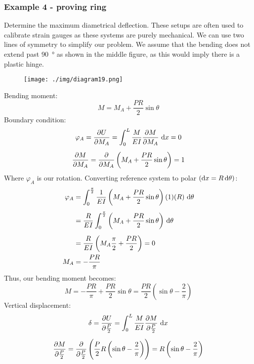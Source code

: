 \subsubsection{Example 4 - proving ring}
Determine the maximum diametrical deflection. These setups are often used to calibrate strain gauges as these systems are purely mechanical. We can use two lines of symmetry to simplify our problem. We assume that the bending does not extend past \SI{90}{\degree} as shown in the middle figure, as this would imply there is a plastic hinge.
\begin{figure}[H]
  \centering
  \texttt{[image: ./img/diagram19.png]}
  \caption{}
\end{figure}
Bending moment:
\begin{equation}
  M = M_A + \frac{PR}{2} \sin\theta
\end{equation}
Boundary condition:
\begin{gather}
  \varphi_A = \frac{\partial U}{\partial M_A } = \int_0^L \frac{M}{EI} \frac{\partial M}{\partial M_A}\, \dif x = 0\\[5pt]
  \frac{\partial M}{\partial M_A} = \frac{\partial}{\partial M_A} \left(M_A + \frac{PR}{2}\sin\theta\right)=1
\end{gather}
Where $\varphi_A$ is our rotation. Converting reference system to polar $\left(\dif x = R \dif \theta\right)$:
\begin{align}
  \varphi_A & = \int_0^{\frac{\pi}{2}} \frac{1}{EI} \left(M_A + \frac{PR}{2}\sin\theta\right)(1)(R)\, \dif \theta \\[5pt]
            & = \frac{R}{EI} \int_0^{\frac{\pi}{2}} \left(M_A + \frac{PR}{2}\sin\theta\right)\, \dif \theta       \\[5pt]
            & = \frac{R}{EI} \left(M_A\frac{\pi}{2} + \frac{PR}{2}\right) = 0                                     \\
  M_A       & = -\frac{PR}{\pi}
\end{align}
Thus, our bending moment becomes:
\begin{equation}
  M = -\frac{PR}{\pi} + \frac{PR}{2}\sin\theta = \frac{PR}{2}\left(\sin\theta-\frac{2}{\pi}\right)
\end{equation}
Vertical displacement:
\begin{gather}
  \delta = \frac{\partial U}{\partial \frac{P}{2}} = \int_0^L \frac{M}{EI} \frac{\partial M}{\partial \frac{P}{2}}\, \dif x\\[5pt]
  \frac{\partial M}{\partial \frac{P}{2}} = \frac{\partial}{\partial \frac{P}{2}} \left(\frac{P}{2}R\left(\sin\theta-\frac{2}{\pi}\right)\right) = R\left(\sin\theta - \frac{2}{\pi}\right)
\end{gather}
